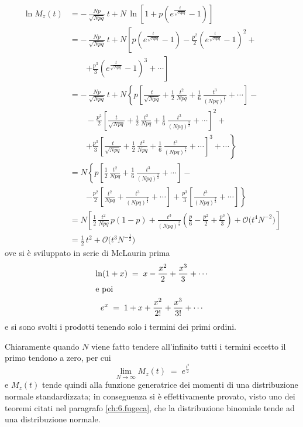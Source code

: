 \begin{align*}
  \ln M_z(t) &= - \, \frac{Np}{\sqrt{Npq}} \, t + N \,
    \ln \left[ 1 + p \left( e^{\frac{t}{\sqrt{Npq}}} -
    1 \right) \right] \\[1ex]
  &= - \, \frac{Np}{\sqrt{Npq}} \, t + N \left[ p
    \left( e^{\frac{t}{\sqrt{Npq}}} - 1 \right) -
    \frac{p^2}{2} \left( e^{\frac{t}{\sqrt{Npq}}} - 1
    \right)^2 + \right. \\[1ex]
  & \qquad \left. + \frac{p^3}{3} \left(
      e^{\frac{t}{\sqrt{Npq}}} - 1 \right)^3
    +\cdots\right] \\[1ex]
  &= - \, \frac{Np}{\sqrt{Npq}} \, t + N \left\{ p
    \left[ \frac{t}{\sqrt{Npq}} + \frac{1}{2} \,
    \frac{t^2}{Npq} + \frac{1}{6} \,
    \frac{t^3}{(Npq)^\frac{3}{2}} +\cdots\right] -
    \right. \\[1ex]
  & \qquad - \frac{p^2}{2} \left[ \frac{t}{\sqrt{Npq}}
    + \frac{1}{2} \, \frac{t^2}{Npq} + \frac{1}{6} \,
    \frac{t^3}{(Npq)^\frac{3}{2}} +\cdots\right]^2 +
    \\[1ex]
  & \qquad \left. + \frac{p^3}{3} \left[
    \frac{t}{\sqrt{Npq}} + \frac{1}{2} \,
    \frac{t^2}{Npq} + \frac{1}{6} \,
    \frac{t^3}{(Npq)^\frac{3}{2}} +\cdots\right]^3
    +\cdots\right\} \\[1ex]
  &= N \left\{ p \left[ \frac{1}{2} \, \frac{t^2}{Npq}
    + \frac{1}{6} \, \frac{t^3}{(Npq)^\frac{3}{2}}
    +\cdots\right] - \right. \\[1ex]
  & \qquad \left. - \frac{p^2}{2} \left[
    \frac{t^2}{Npq} + \frac{t^3}{(Npq)^\frac{3}{2}}
    +\cdots\right] + \frac{p^3}{3} \left[
    \frac{t^3}{(Npq)^\frac{3}{2}} +\cdots\right]
    \right\} \\[1ex]
  &= N \left[ \frac{1}{2} \, \frac{t^2}{Npq} \, p(1-p)
    + \frac{t^3}{(Npq)^\frac{3}{2}} \left( \frac{p}{6}
    - \frac{p^2}{2} + \frac{p^3}{3} \right) +
    \mathcal{O} \bigl( t^4 N^{-2} \bigr) \right] \\[1ex]
  &= \frac{1}{2} \, t^2 + \mathcal{O} \bigl( t^3
    N^{-\frac{1}{2}} \bigr)
\end{align*}
ove si \`e sviluppato in serie di McLaurin prima
\begin{gather*}
  \ln(1+x) \; = \; x - \frac{x^2}{2} + \frac{x^3}{3}
    +\cdots \\
  \intertext{e poi}
  e^x \; = \; 1 + x + \frac{x^2}{2!} + \frac{x^3}{3!}
    +\cdots
\end{gather*}
e si sono svolti i prodotti tenendo solo i termini dei primi
ordini.

Chiaramente quando $N$ viene fatto tendere all'infinito
tutti i termini eccetto il primo tendono a zero, per cui
\begin{equation*}
  \lim_{N \to \infty} M_z(t) \; = \; e^\frac{t^2}{2}
\end{equation*}
e $M_z(t)$ tende quindi alla funzione generatrice dei
momenti di una distribuzione normale standardizzata; in
conseguenza si \`e effettivamente provato, visto uno dei
teoremi citati nel paragrafo \ref{ch:6.fugeca}, che la
distribuzione binomiale tende ad una distribuzione normale.

